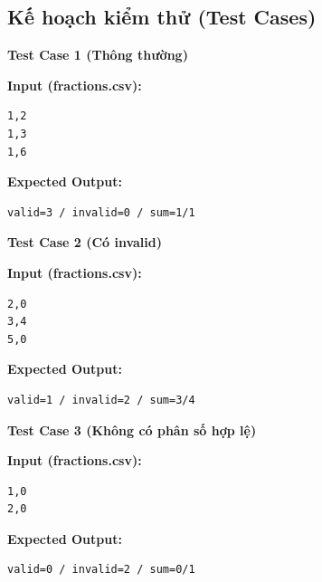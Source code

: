 \subsection{Kế hoạch kiểm thử (Test Cases)}

\textbf{Test Case 1 (Thông thường)}

\textbf{Input (fractions.csv):}
\begin{lstlisting}
1,2
1,3
1,6
\end{lstlisting}

\textbf{Expected Output:}
\begin{lstlisting}
valid=3 / invalid=0 / sum=1/1
\end{lstlisting}

\vspace{0.5cm}

\textbf{Test Case 2 (Có invalid)}

\textbf{Input (fractions.csv):}
\begin{lstlisting}
2,0
3,4
5,0
\end{lstlisting}

\textbf{Expected Output:}
\begin{lstlisting}
valid=1 / invalid=2 / sum=3/4
\end{lstlisting}

\vspace{0.5cm}

\textbf{Test Case 3 (Không có phân số hợp lệ)}

\textbf{Input (fractions.csv):}
\begin{lstlisting}
1,0
2,0
\end{lstlisting}

\textbf{Expected Output:}
\begin{lstlisting}
valid=0 / invalid=2 / sum=0/1
\end{lstlisting}